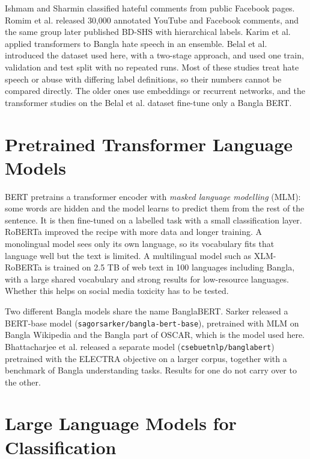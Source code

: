 Ishmam and Sharmin \cite{ishmam2019hateful} classified hateful comments from public Facebook pages. Romim et al. \cite{romim2021hate} released 30,000 annotated YouTube and Facebook comments, and the same group later published BD-SHS \cite{romim2022bdshs} with hierarchical labels. Karim et al. \cite{karim2021deephateexplainer} applied transformers to Bangla hate speech in an ensemble. Belal et al. \cite{belal2023toxic} introduced the dataset used here, with a two-stage approach, and used one train, validation and test split with no repeated runs. Most of these studies treat hate speech or abuse with differing label definitions, so their numbers cannot be compared directly. The older ones use embeddings or recurrent networks, and the transformer studies on the Belal et al. dataset fine-tune only a Bangla BERT.

\section{Pretrained Transformer Language Models}

BERT \cite{devlin2019bert} pretrains a transformer encoder with \emph{masked language modelling} (MLM): some words are hidden and the model learns to predict them from the rest of the sentence. It is then fine-tuned on a labelled task with a small classification layer. RoBERTa \cite{liu2019roberta} improved the recipe with more data and longer training. A monolingual model sees only its own language, so its vocabulary fits that language well but the text is limited. A multilingual model such as XLM-RoBERTa \cite{conneau2020xlmr} is trained on 2.5 TB of web text in 100 languages including Bangla, with a large shared vocabulary and strong results for low-resource languages. Whether this helps on social media toxicity has to be tested.

Two different Bangla models share the name BanglaBERT. Sarker \cite{sarker2020banglabert} released a BERT-base model (\texttt{sagorsarker/bangla-bert-base}), pretrained with MLM on Bangla Wikipedia and the Bangla part of OSCAR, which is the model used here. Bhattacharjee et al. \cite{bhattacharjee2022banglabert} released a separate model (\texttt{csebuetnlp/banglabert}) pretrained with the ELECTRA objective on a larger corpus, together with a benchmark of Bangla understanding tasks. Results for one do not carry over to the other.

\section{Large Language Models for Classification}

